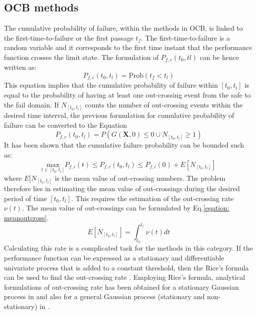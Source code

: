 \subsection{OCB methods}

\noindent
The cumulative probability of failure, within the methods in OCB, is linked to the first-time-to-failure or the first passage $t_{f}$. The first-time-to-failure is 
a random variable and it corresponds to the first time instant that the performance function crosses the limit state. The formulation of $P_{f,c}(t_0,tl)$ can be hence
written as: 
\begin{equation}
P_{f,c}(t_0,t_l) = \textrm{Prob}(t_{f}<t_l)
\label{eq:cumcross}
\end{equation}
This equation implies that the cumulative probability of failure within $[t_0, t_l]$ is equal to the probability of having at least one out-crossing event from the 
safe to the fail domain. If $N_{[t_0,t_l]}$ counts the number of out-crossing events within the desired time interval, the previous formulation for cumulative 
probability of failure can be converted to the Equation 
\begin{equation}
P_{f,c}(t_0,t_l) = P(G(\textbf{X},0) \leq 0 \cup N_{[t_0,t_l]} \geq 1)
\label{eqation: cumnew}
\end{equation}
It has been shown that the cumulative failure probability can be bounded such as: 
\begin{equation}
\underset{t \in [t_0, t_l]}{\text{max}}P_{f,i}(t) \leq P_{f,c}(t_0,t_l) \leq P_{f,i}(0)+E[N_{[t_0,t_l]}]
\label{eqation: bound}
\end{equation}
where $E[N_{[t_0,t_l]}$ is the mean value of out-crossing numbers. 
The problem therefore lies in estimating the mean value of out-crossings during the desired period of time $[t_0,t_l]$. This requires the estimation of the 
out-crossing rate $\nu (t)$. The mean value of out-crossings can be formulated by Eq.\ref{eqation: meanoutcross}.
\begin{equation}
E[N_{[t_0,t_l]}] = \int_{t_0}^{t_l}\nu (t)dt 
\label{eqation: meanoutcross}
\end{equation}
Calculating this rate is a complicated task for the methods in this category. If the performance function can be expressed as a stationary and differentiable 
univariate process that is added to a constant threshold, then the Rice's formula can be used to find the out-crossing rate \cite{Rice1944}. Employing Rice's 
formula, analytical formulations of out-crossing rate has been obtained for a stationary Gaussian process in \cite{LUTES20041} and also for a general Gaussian 
process (stationary and non-stationary) in \cite{LUTES2009, Surdet2008}. 

